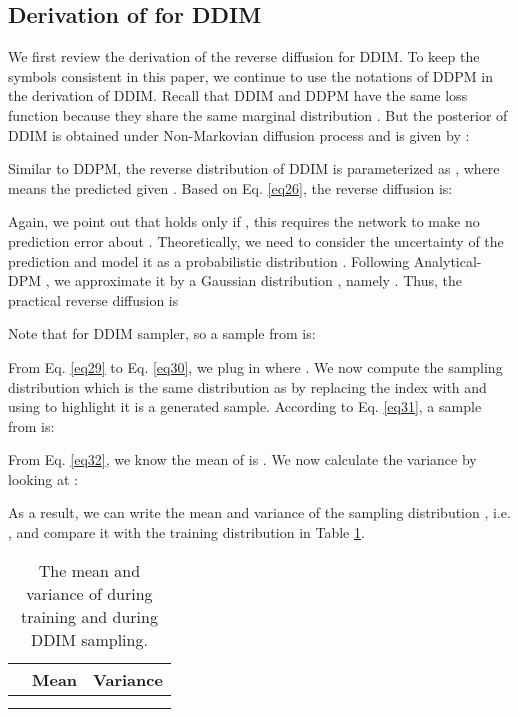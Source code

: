 \documentclass{article} \usepackage{iclr2024_conference,times}
\begin{document}
\subsection{Derivation of \texorpdfstring{}{Lg} for DDIM}
\label{Append:1.5}
We first review the derivation of the reverse diffusion  for DDIM. To keep the symbols consistent in this paper, we continue to use the notations of DDPM in the derivation of DDIM. Recall that DDIM and DDPM have the same loss function because they share the same marginal distribution . But the posterior  of DDIM is obtained under Non-Markovian diffusion process and is given by \citet{DDIM}:


\noindent
Similar to DDPM, the reverse distribution of DDIM is parameterized as , where  means the predicted  given . Based on Eq. \ref{eq26}, the reverse diffusion  is: 


Again, we point out that  holds only if , this requires the network to make no prediction error about . Theoretically, we need to consider the uncertainty of the prediction  and model it as a probabilistic distribution . Following Analytical-DPM \citep{bao2022analytic}, we approximate it by a Gaussian distribution , namely . Thus, the practical reverse diffusion  is


\noindent
Note that  for DDIM sampler, so a sample  from  is:



\noindent
From Eq. \ref{eq29} to Eq. \ref{eq30}, we plug in  where . We now compute the sampling distribution  which is the same distribution as  by replacing the index  with  and using  to highlight it is a generated sample. According to Eq. \ref{eq31}, a sample  from  is:


\noindent
From Eq. \ref{eq32}, we know the mean of  is . We now calculate the variance by looking at :


\noindent
As a result, we can write the mean and variance of the sampling distribution , i.e. , and compare it with the training distribution  in Table \ref{tab: DDIM sampling distribution}. 

\begin{table}[ht]
\caption{
The mean and variance of  during training and  during DDIM sampling.}
\label{tab: DDIM sampling distribution}
\begin{center}
\begin{tabular}{@{}lll@{}}
\toprule
 & Mean & Variance \\ \midrule
 &  &  \\
  &  &  \\ \bottomrule
\end{tabular}
\end{center}
\end{table}
\end{document}
